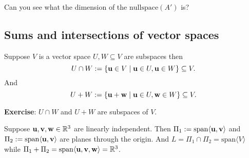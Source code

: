 \documentclass[10pt, a4paper]{article}
\begin{document}
Can you see what the dimension of the $\mathrm{nullspace}(A')$ is?

\subsection{Sums and intersections of vector spaces}
\begin{definition}
    Suppose $V$ is a vector space $U, W \subseteq V$ are subspaces then
    \[
    U \cap W := \{\mathbf{u} \in V\mid \mathbf{u} \in U, \mathbf{u} \in W\} \subseteq V.
    \]
    And
    \[
    U + W := \{\mathbf{u} + \mathbf{w} \mid \mathbf{u} \in U, \mathbf{w} \in W\} \subseteq V.
    \]
\end{definition}

\textbf{Exercise}: $U \cap W$ and $U + W$ are subspaces of $V$.

\begin{example}
    Suppose $\mathbf{u, v, w} \in \mathbb{R} ^ 3$ are linearly independent.
    Then $\Pi_1 := \mathrm{span}\langle\mathbf{u, v}\rangle$ and $\Pi_2 := \mathrm{span}\langle\mathbf{u, v}\rangle$ are planes through the origin.
    And $L = \Pi_1 \cap \Pi_2 = \mathrm{span}\langle V \rangle$ while $\Pi_1 + \Pi_2 = \mathrm{span}\langle\mathbf{u, v, w}\rangle = \mathbb{R} ^ 3$.
\end{example}
\end{document}
